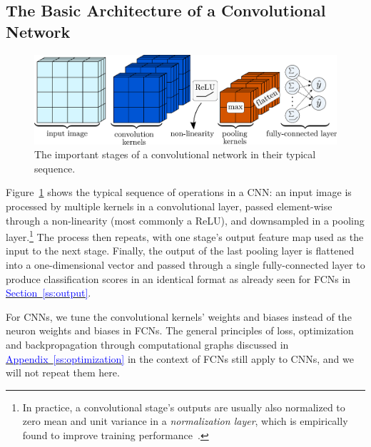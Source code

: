 \documentclass[11pt, a4paper]{article}
\newcommand{\myhref}[2]{\hyperref[#1]{\textcolor{blue}{#2}}}
\begin{document}

\subsection{The Basic Architecture of a Convolutional Network} \label{ss:cnn-architecture}

\begin{figure}[htb!]
    \centering
    \includegraphics[width=0.95\linewidth]{vector/cnn-architecture.pdf}
    \caption{The important stages of a convolutional network in their typical sequence.}
    \label{fig:cnn-architecture}
\end{figure}

Figure~\ref{fig:cnn-architecture} shows the typical sequence of operations in a CNN: an input image is processed by multiple kernels in a convolutional layer, passed element-wise through a non-linearity (most commonly a ReLU), and downsampled in a pooling layer.\footnote{In practice, a convolutional stage's outputs are usually also normalized to zero mean and unit variance in a \textit{normalization layer}, which is empirically found to improve training performance~\cite{homl}.} The process then repeats, with one stage's output feature map used as the input to the next stage.
Finally, the output of the last pooling layer is flattened into a one-dimensional vector and passed through a single fully-connected layer to produce classification scores in an identical format as already seen for FCNs in \myhref{ss:output}{Section~\ref{ss:output}}.

For CNNs, we tune the convolutional kernels' weights and biases instead of the neuron weights and biases in FCNs.
The general principles of loss, optimization and backpropagation through computational graphs discussed in \myhref{ss:optimization}{Appendix~\ref{ss:optimization}} in the context of FCNs still apply to CNNs, and we will not repeat them here.

\end{document}
